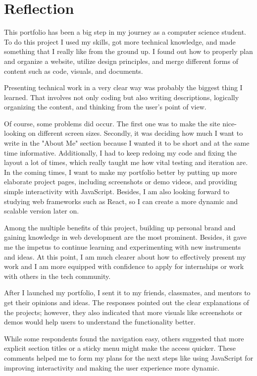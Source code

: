 \documentclass[12pt,a4paper]{article}
\begin{document}
\section{Reflection}
This portfolio has been a big step in my journey as a computer science student. To do this project I used my skills, got more technical knowledge, and made something that I really like from the ground up. I found out how to properly plan and organize a website, utilize design principles, and merge different forms of content such as code, visuals, and documents.

Presenting technical work in a very clear way was probably the biggest thing I learned. That involves not only coding but also writing descriptions, logically organizing the content, and thinking from the user’s point of view.

Of course, some problems did occur. The first one was to make the site nice-looking on different screen sizes. Secondly, it was deciding how much I want to write in the "About Me" section because I wanted it to be short and at the same time informative. Additionally, I had to keep redoing my code and fixing the layout a lot of times, which really taught me how vital testing and iteration are.
In the coming times, I want to make my portfolio better by putting up more elaborate project pages, including screenshots or demo videos, and providing simple interactivity with JavaScript. Besides, I am also looking forward to studying web frameworks such as React, so I can create a more dynamic and scalable version later on.

Among the multiple benefits of this project, building up personal brand and gaining knowledge in web development are the most prominent. Besides, it gave me the impetus to continue learning and experimenting with new instruments and ideas. At this point, I am much clearer about how to effectively present my work and I am more equipped with confidence to apply for internships or work with others in the tech community.

After I launched my portfolio, I sent it to my friends, classmates, and mentors to get their opinions and ideas. The responses pointed out the clear explanations of the projects; however, they also indicated that more visuals like screenshots or demos would help users to understand the functionality better.

While some respondents found the navigation easy, others suggested that more explicit section titles or a sticky menu might make the access quicker. These comments helped me to form my plans for the next steps like using JavaScript for improving interactivity and making the user experience more dynamic.
\end{document}
